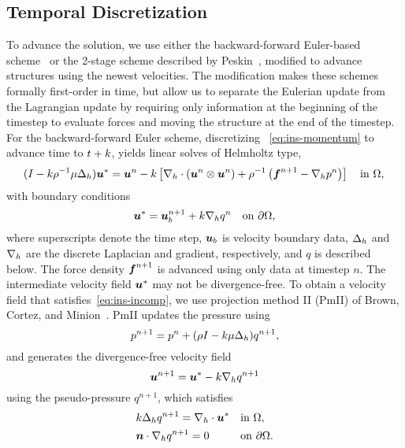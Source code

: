 

\subsection{Temporal Discretization}\label{sec:ns_time}

To advance the solution, we use either the backward-forward Euler-based scheme~\cite{Ascher:1997tm} or the 2-stage
scheme described by Peskin~\cite{Peskin:2002go}, modified to advance structures using the newest velocities. The
modification makes these schemes formally first-order in time, but allow us to separate the Eulerian update from
the Lagrangian update by requiring only information at the beginning of the timestep to evaluate forces and moving
the structure at the end of the timestep. For the backward-forward Euler scheme, discretizing~%
\eqref{eq:ins-momentum} to advance time to $t+k$, yields linear solves of Helmholtz type,
\begin{equation}\label{eq:disc-momentum}
    (I - \timestep\rho^{-1}\mu \laplacian_h) \u^\ast = \u^n - \timestep\left[\div[h]\left(\u^n\otimes\u^n\right) + \rho^{-1}\left(\f^{n+1} - \grad[h]p^n\right)\right] \quad\text{in}~\domain, \\
\end{equation}
with boundary conditions
\begin{equation}\label{eq:disc-bdy}
    \u^\ast = \u^{n+1}_b + \timestep \grad[h] q^{n} \quad\text{on}~\partial\domain,
\end{equation}
where superscripts denote the time step, $\boldsymbol{u}_b$ is velocity boundary data, $\Delta_h$ and $\grad[h]$ are the
discrete Laplacian and gradient, respectively, and $q$ is described below. The force density $\boldsymbol{f}^{n+1}$ is
advanced using only data at timestep $n$. The intermediate velocity field $\boldsymbol{u}^\ast$ may not be divergence-free. To
obtain a velocity field that satisfies~\eqref{eq:ins-incomp}, we use projection method II (PmII) of Brown, Cortez,
and Minion~\cite{Brown:2001bq}. PmII updates the pressure using
\begin{equation*}
    p^{n+1} = p^n + (\rho I - k\mu\Delta_h)q^{n+1},
\end{equation*}
and generates the divergence-free velocity field
\begin{equation}\label{eq:vel-update}
    \u^{n+1} = \u^\ast - \timestep\grad[h]q^{n+1}
\end{equation}
using the pseudo-pressure $q^{n+1}$, which satisfies
\begin{equation}
\begin{alignedat}{2}
    &k \laplacian_h q^{n+1} = \div[h]\u^\ast &&\quad \text{in}~\domain, \\
    &\n\cdot\grad[h] q^{n+1} = 0                    &&\quad \text{on}~\partial\domain.
\end{alignedat}
\end{equation}
